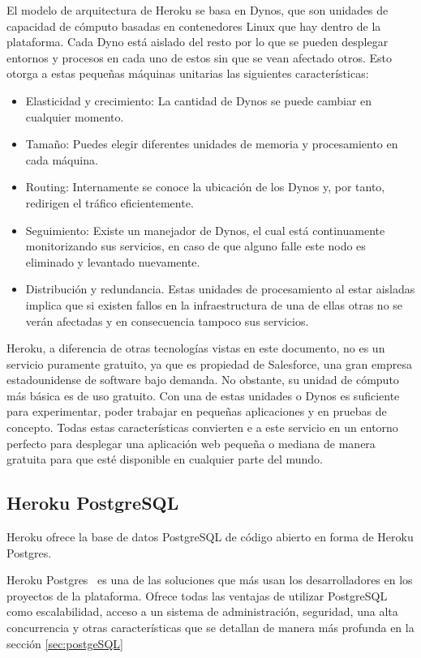 \documentclass[a4paper, 12pt]{book}
\begin{document}
El modelo de arquitectura de Heroku se basa en Dynos, que son unidades de capacidad de cómputo basadas en contenedores Linux que hay dentro de la plataforma. Cada Dyno está aislado del resto por lo que se pueden desplegar entornos y procesos en cada uno de estos sin que se vean afectado otros. Esto otorga a estas pequeñas máquinas unitarias las siguientes características: 
\begin{itemize}
	\item Elasticidad y crecimiento: La cantidad de Dynos se puede cambiar en cualquier momento. 
	\item Tamaño: Puedes elegir diferentes unidades de memoria y procesamiento en cada máquina. 
	\item Routing: Internamente se conoce la ubicación de los Dynos y, por tanto, redirigen el tráfico eficientemente. 
	\item Seguimiento: Existe un manejador de Dynos, el cual está continuamente monitorizando sus servicios, en caso de que alguno falle este nodo es eliminado y levantado nuevamente. 
	\item Distribución y redundancia. Estas unidades de procesamiento al estar aisladas implica que si existen fallos en la infraestructura de una de ellas otras no se verán afectadas y en consecuencia tampoco sus servicios. 	
\end{itemize}

Heroku, a diferencia de otras tecnologías vistas en este documento, no es un servicio puramente gratuito, ya que es propiedad de Salesforce, una gran empresa estadounidense de software bajo demanda. No obstante, su unidad de cómputo más básica es de uso gratuito. Con una de estas unidades o Dynos es suficiente para experimentar, poder trabajar en pequeñas aplicaciones y en pruebas de concepto. Todas estas características convierten e a este servicio en un entorno perfecto para desplegar una aplicación web pequeña o mediana de manera gratuita para que esté disponible en cualquier parte del mundo. 
\subsection{Heroku PostgreSQL}
Heroku ofrece la base de datos PostgreSQL de código abierto en forma de Heroku Postgres. 

Heroku Postgres~\cite{heroku-postgresql} es una de las soluciones que más usan los desarrolladores en los proyectos de la plataforma. Ofrece todas las ventajas de utilizar PostgreSQL como escalabilidad, acceso a un sistema de administración, seguridad, una alta concurrencia y otras características que se detallan de manera más profunda en la sección \ref{sec:postgeSQL}
\end{document}
